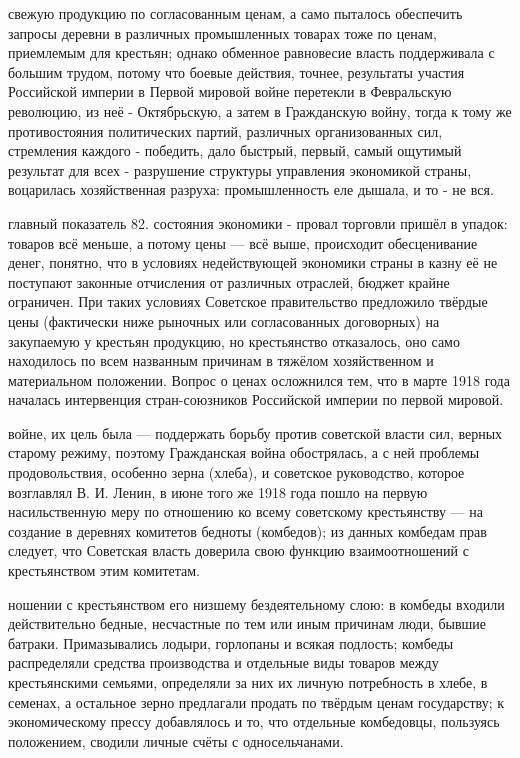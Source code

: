свежую продукцию по согласованным ценам, а само пыталось обеспечить запросы деревни в различных промышленных товарах тоже по ценам, приемлемым для крестьян; однако обменное равновесие власть поддерживала с большим трудом, потому что боевые действия, точнее, результаты участия Российской империи в Первой мировой войне перетекли в Февральскую революцию, из неё - Октябрьскую, а затем в Гражданскую войну, тогда к тому же противостояния политических партий, различных организованных сил, стремления каждого - победить, дало быстрый, первый, самый ощутимый результат для всех - разрушение структуры управления экономикой страны, воцарилась хозяйственная разруха: промышленность еле дышала, и то - не вся.

главный показатель 82. состояния экономики - провал торговли пришёл в упадок: товаров всё меньше, а потому цены — всё выше, происходит обесценивание денег, понятно, что в условиях недействующей экономики страны в казну её не поступают законные отчисления от различных отраслей, бюджет крайне ограничен. При таких условиях Советское правительство предложило твёрдые цены (фактически ниже рыночных или согласованных договорных) на закупаемую у крестьян продукцию, но крестьянство отказалось, оно само находилось по всем названным причинам в тяжёлом хозяйственном и материальном положении. Вопрос о ценах осложнился тем, что в марте 1918 года началась интервенция стран-союзников Российской империи по первой мировой.

войне, их цель была — поддержать борьбу против советской власти сил, верных старому режиму, поэтому Гражданская война обострялась, а с ней проблемы продовольствия, особенно зерна (хлеба), и советское руководство, которое возглавлял В. И. Ленин, в июне того же 1918 года пошло на первую насильственную меру по отношению ко всему советскому крестьянству — на создание в деревнях комитетов бедноты (комбедов); из данных комбедам прав следует, что Советская власть доверила свою функцию взаимоотношений с крестьянством этим комитетам.

ношении с крестьянством его низшему бездеятельному слою: в комбеды входили действительно бедные, несчастные по тем или иным причинам люди, бывшие батраки. Примазывались лодыри, горлопаны и всякая подлость; комбеды распределяли средства производства и отдельные виды товаров между крестьянскими семьями, определяли за них их личную потребность в хлебе, в семенах, а остальное зерно предлагали продать по твёрдым ценам государству; к экономическому прессу добавлялось и то, что отдельные комбедовцы, пользуясь положением, сводили личные счёты с односельчанами.


